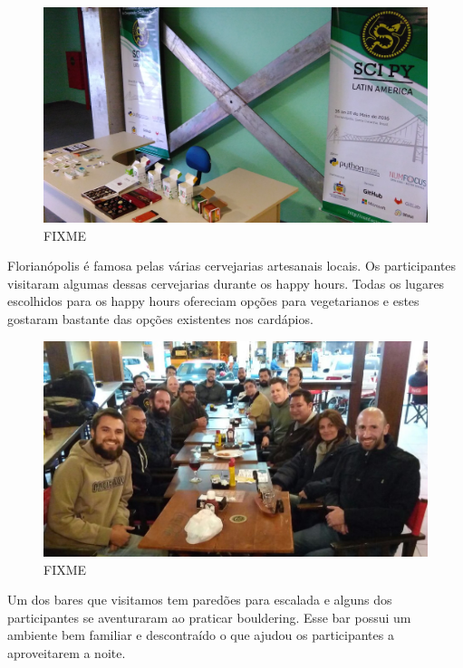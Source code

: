 \documentclass[12pt]{article}
\begin{document}
\begin{figure}[!htb]
\center
\includegraphics[height=.3\textheight]{social-break.jpg}
\caption{FIXME}
\end{figure}

Florianópolis é famosa pelas várias cervejarias artesanais locais.
Os participantes visitaram algumas dessas cervejarias durante os happy hours.
Todas os lugares escolhidos para os happy hours ofereciam opções para
vegetarianos e estes gostaram bastante das opções existentes nos cardápios.

\begin{figure}[!htb]
\center
\includegraphics[height=.3\textheight]{social-viking.jpg}
\caption{FIXME}
\end{figure}

Um dos bares que visitamos tem paredões para escalada
e alguns dos participantes se aventuraram ao praticar bouldering.
Esse bar possui um ambiente bem familiar e descontraído
o que ajudou os participantes a aproveitarem a noite.
\end{document}
